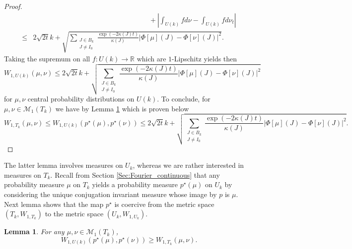 \documentclass[10pt,11pt]{amsart}%
\newtheorem{lemma}[theorem]{Lemma}
\begin{document}
\begin{proof}
\begin{align*}
&\hspace{7cm}+\left\vert\int_{U(k)}fd\nu-\int_{U(k)}fd\nu_t\right\vert\\
\leq& 2\sqrt{2t}k+\sqrt{\sum_{\substack{J\in B_{k}\\J\not=I_0}}\frac{\exp(-2\kappa(J)t)}{\kappa(J)}\left\vert \Phi[\mu](J)-\Phi[\nu](J)\right\vert^2}.
\end{align*}
Taking the supremum on all $f:U(k)\rightarrow \mathbb{R}$ which are $1$-Lipschitz yields then
$$W_{1,U(k)}(\mu,\nu)\leq 2\sqrt{2t}k+\sqrt{\sum_{\substack{J\in B_{k}\\J\not=I_0}}\frac{\exp(-2\kappa(J)t)}{\kappa(J)}\left\vert \Phi[\mu](J)-\Phi[\nu](J)\right\vert^2}$$
for $\mu,\nu$ central probability distributions on $U(k)$. To conclude, for $\mu,\nu\in \mathcal{M}_1( T_{k})$ we have by Lemma \ref{lem:coercive_wasserstein} which is proven below
$$W_{1, T_{k}}(\mu,\nu)\leq W_{1,U(k)}(p^{\star}(\mu),p^{\star}(\nu))\leq 2\sqrt{2t}k+\sqrt{\sum_{\substack{J\in B_{k}\\J\not=I_0}}\frac{\exp(-2\kappa(J)t)}{\kappa(J)}\left\vert \Phi[\mu](J)-\Phi[\nu](J)\right\vert^2}.$$
\end{proof}
The latter lemma involves measures on $U_k$, whereas we are rather interested in measures on $T_k$. Recall from Section \ref{Sec:Fourier_continuous} that any probability measure $\mu$ on $ T_{k}$ yields a probability measure $p^{\star}(\mu)$ on $U_k$ by considering the unique conjugation invariant measure whose image by $p$ is $\mu$. Next lemma shows that the map $p^{\star}$ is coercive from the metric space $(T_k,W_{1,T_k})$ to the metric space $(U_k,W_{1,U_k})$.
\begin{lemma}\label{lem:coercive_wasserstein}
For any $\mu,\nu\in \mathcal{M}_1( T_{k})$,
$$W_{1,U(k)}(p^{\star}(\mu),p^{\star}(\nu))\geq W_{1, T_{k}}(\mu,\nu).$$
\end{lemma}
\end{document}
